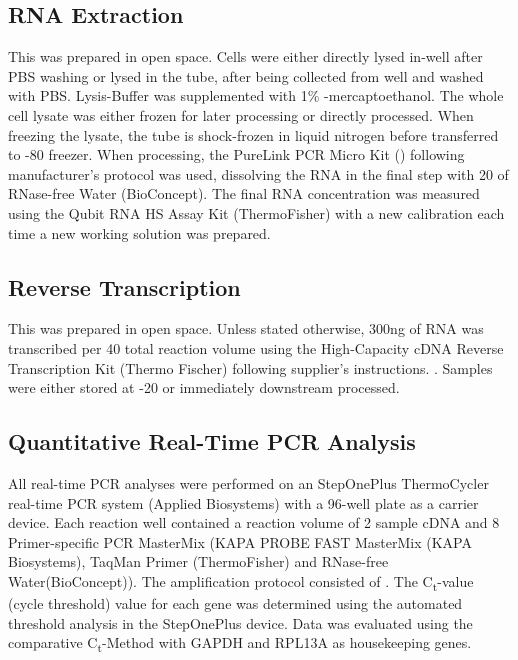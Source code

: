 \subsection{RNA Extraction}
This was prepared in open space. Cells were either directly lysed in-well after PBS washing or lysed in the tube, after being collected from well and washed with PBS. Lysis-Buffer was supplemented with 1\% \textbeta-mercaptoethanol. The whole cell lysate was either frozen for later processing or directly processed. When freezing the lysate, the tube is shock-frozen in liquid nitrogen before transferred to -80 \degC freezer. When processing, the PureLink PCR Micro Kit () following manufacturer's protocol was used, dissolving the RNA in the final step with 20\mul{} of RNase-free Water (BioConcept). The final RNA concentration was measured using the Qubit RNA HS Assay Kit (ThermoFisher) with a new calibration each time a new working solution was prepared.

\subsection{Reverse Transcription}
This was prepared in open space. Unless stated otherwise, 300ng of RNA was transcribed per 40\mul{} total reaction volume using the High-Capacity cDNA Reverse Transcription Kit (Thermo Fischer) following supplier's instructions. . Samples were either stored at -20 \degC or immediately downstream processed. 

\subsection{Quantitative Real-Time PCR Analysis}
All real-time PCR analyses were performed on an StepOnePlus  ThermoCycler real-time PCR system (Applied Biosystems) with a 96-well plate as a carrier device. Each reaction well contained a reaction volume of 2\mul{} sample cDNA and 8\mul{} Primer-specific PCR MasterMix (KAPA PROBE FAST MasterMix (KAPA Biosystems), TaqMan\textregistered{} Primer (ThermoFisher) and RNase-free Water(BioConcept)). The amplification protocol consisted of . The C\textsubscript{t}-value (cycle threshold) value for each gene was determined using the automated threshold analysis in the StepOnePlus device. Data was evaluated using the comparative C\textsubscript{t}-Method with GAPDH and RPL13A as housekeeping genes.

